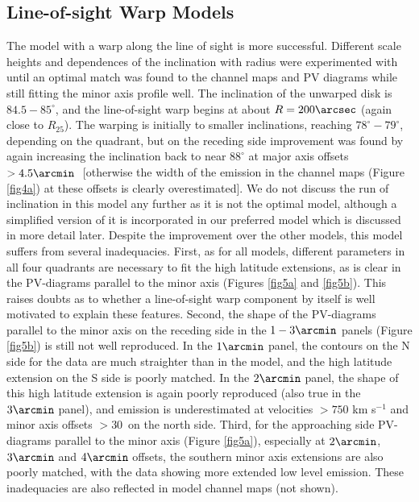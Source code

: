 \documentclass[useAMS,usenatbib]{mn2e}
\begin{document}
\subsection{Line-of-sight Warp Models} \label{U2082w} The model with a warp along the line of sight is more successful.
Different scale heights and dependences of the inclination with radius
were experimented with until an optimal match was found to the channel maps and PV diagrams while still fitting the minor axis profile well.  The
inclination of the unwarped disk is $84.5-85^{\circ}$, and the
line-of-sight warp begins at about $R=200\arcsec$ (again close to $R_{25}$).
The warping is initially to smaller inclinations, reaching 
$78^{\circ} - 79^{\circ}$, depending on the quadrant, but on the
receding side improvement was found by again increasing the
inclination back to near $88^{\circ}$ at major axis offsets $>4.5\arcmin\ $
[otherwise the width of the emission in the channel maps (Figure \ref{fig4a})
at these offsets is clearly overestimated].  We do not discuss the run of
inclination in this model any further as it is not the optimal model,
although a simplified version of it is incorporated in our preferred
model which is discussed in more detail later.  Despite the
improvement over the other models, this model suffers from several
inadequacies.  First, as for all models, different parameters in all
four quadrants are necessary to fit the high latitude extensions, as
is clear in the PV-diagrams parallel to the minor axis (Figures \ref{fig5a}
and \ref{fig5b}).  This raises doubts as to whether a
line-of-sight warp component by itself is well motivated to explain
these features.  Second, the shape of the PV-diagrams parallel to the minor axis on the receding
side in the $1-3\arcmin$ panels (Figure \ref{fig5b}) is still not well reproduced.  In the $1\arcmin$
panel, the contours on the N side for the data are much straighter
than in the model, and the high latitude extension on the S side is
poorly matched.  In the $2\arcmin$ panel, the shape of this high latitude
extension is again poorly reproduced (also true in the $3\arcmin$ panel),
and emission is underestimated at velocities $>750$ km s$^{-1}$ and
minor axis offsets $>30$\arcsec\ on the north side.  Third, for the
approaching side PV-diagrams parallel to the minor axis (Figure \ref{fig5a}), especially at $2\arcmin$, $3\arcmin$ and $4\arcmin$
offsets, the southern minor axis extensions are also poorly matched,
with the data showing more extended low level emission.  These
inadequacies are also reflected in model channel maps (not shown).\\
\end{document}
